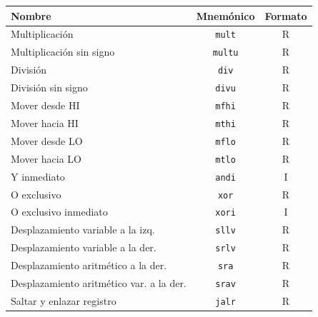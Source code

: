 \documentclass[11pt, a4paper]{article}
\begin{document}
\begin{multicols*}{2}
        \begin{tcolorbox}[
        colback=white, 
        colframe=blue!40!black, 
        title= {\centering \textbf{Repertorio de Instrucciones MIPS32 (Continuación)} },
        fonttitle=\bfseries,
        size=small
        ]
            \begin{tabularx}{\linewidth}{Xcc}
                \toprule
                \textbf{Nombre} & \textbf{Mnemónico} & \textbf{Formato} \\
                \midrule
                Multiplicación & \texttt{mult} & R \\
                Multiplicación sin signo & \texttt{multu} & R \\
                División & \texttt{div} & R \\
                División sin signo & \texttt{divu} & R \\
                Mover desde HI & \texttt{mfhi} & R \\
                Mover hacia HI & \texttt{mthi} & R \\
                Mover desde LO & \texttt{mflo} & R \\
                Mover hacia LO & \texttt{mtlo} & R \\
                Y inmediato & \texttt{andi} & I \\
                O exclusivo & \texttt{xor} & R \\
                O exclusivo inmediato & \texttt{xori} & I \\
                Desplazamiento variable a la izq. & \texttt{sllv} & R \\
                Desplazamiento variable a la der. & \texttt{srlv} & R \\
                Desplazamiento aritmético a la der. & \texttt{sra} & R \\
                Desplazamiento aritmético var. a la der. & \texttt{srav} & R \\
                Saltar y enlazar registro & \texttt{jalr} & R \\
                \bottomrule
            \end{tabularx}
        \end{tcolorbox}
        

\end{multicols*}
\end{document}
